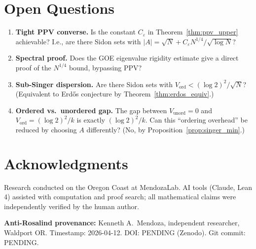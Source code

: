 \documentclass[11pt]{amsart}
\theoremstyle{plain}
\theoremstyle{definition}
\theoremstyle{remark}
\begin{document}
\section{Open Questions}

\begin{enumerate}
\item \textbf{Tight PPV converse.} Is the constant $C_\varepsilon$ in
  Theorem~\ref{thm:ppv_upper} achievable?  I.e., are there Sidon sets
  with $|A| = \sqrt{N} + C_\varepsilon N^{1/4}/\sqrt{\log N}$?
\item \textbf{Spectral proof.} Does the GOE eigenvalue rigidity estimate
  give a direct proof of the $N^{1/4}$ bound, bypassing PPV?
\item \textbf{Sub-Singer dispersion.} Are there Sidon sets with
  $V_{\mathrm{ord}} < (\log 2)^2/\sqrt{N}$?  (Equivalent to Erd\H{o}s
  conjecture by Theorem~\ref{thm:erdos_equiv}.)
\item \textbf{Ordered vs.\ unordered gap.} The gap between $V_{\mathrm{unord}}
  = 0$ and $V_{\mathrm{ord}} = (\log 2)^2/k$ is exactly $(\log 2)^2/k$.
  Can this ``ordering overhead'' be reduced by choosing $A$ differently?
  (No, by Proposition~\ref{prop:singer_min}.)
\end{enumerate}

\section*{Acknowledgments}

Research conducted on the Oregon Coast at MendozaLab.  AI tools (Claude,
Lean 4) assisted with computation and proof search; all mathematical
claims were independently verified by the human author.

\medskip
\noindent\textbf{Anti-Rosalind provenance:} Kenneth A.\ Mendoza, independent
researcher, Waldport OR. Timestamp: 2026-04-12. DOI: PENDING (Zenodo).
Git commit: PENDING.
\end{document}
